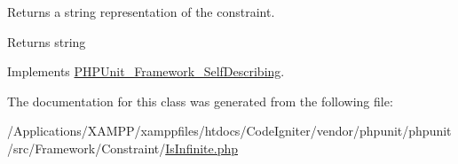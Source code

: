 Returns a string representation of the constraint.

\begin{DoxyReturn}{Returns}
string 
\end{DoxyReturn}


Implements \mbox{\hyperlink{interface_p_h_p_unit___framework___self_describing_a5558c5d549f41597377fa1ea8a1cefa3}{P\+H\+P\+Unit\+\_\+\+Framework\+\_\+\+Self\+Describing}}.



The documentation for this class was generated from the following file\+:\begin{DoxyCompactItemize}
\item 
/\+Applications/\+X\+A\+M\+P\+P/xamppfiles/htdocs/\+Code\+Igniter/vendor/phpunit/phpunit/src/\+Framework/\+Constraint/\mbox{\hyperlink{_is_infinite_8php}{Is\+Infinite.\+php}}\end{DoxyCompactItemize}
